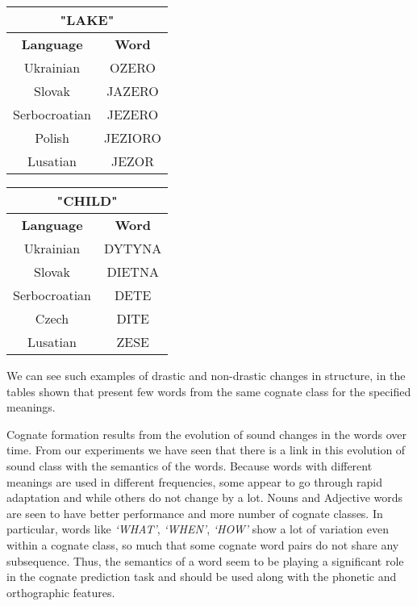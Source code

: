 \begin{table}[h]
\centering
	\begin{minipage}{.5\linewidth}
      \centering

\begin{tabular}{|c|c|}
\hline
\multicolumn{2}{|c|}{\textbf{"LAKE"}} \\ \hline
\textbf{Language}   & \textbf{Word}   \\ \hline
Ukrainian           & OZERO           \\ \hline
Slovak              & JAZERO          \\ \hline
Serbocroatian       & JEZERO          \\ \hline
Polish              & JEZIORO         \\ \hline
Lusatian            & JEZOR           \\ \hline
\end{tabular}


	\end{minipage}%
    \begin{minipage}{.5\linewidth}
    \centering

\begin{tabular}{|c|c|}
\hline
\multicolumn{2}{|c|}{\textbf{"CHILD"}} \\ \hline
\textbf{Language}    & \textbf{Word}   \\ \hline
Ukrainian            & DYTYNA          \\ \hline
Slovak               & DIETNA          \\ \hline
Serbocroatian        & DETE            \\ \hline
Czech                & DITE            \\ \hline
Lusatian             & ZESE            \\ \hline
\end{tabular}

	\end{minipage} 
\end{table}

We can see such examples of drastic and non-drastic changes in structure, in the tables shown that present few words from the same cognate class for the specified meanings.

Cognate formation results from the evolution of sound changes in the words over time. From our experiments we have seen that there is a link in this evolution of sound class with the semantics of the words. Because words with different meanings are used in different frequencies, some appear to go through rapid adaptation and while others do not change by a lot. Nouns and Adjective words are seen to have better performance and more number of cognate classes. In particular, words like \textit{`WHAT'}, \textit{`WHEN'}, \textit{`HOW'} show a lot of variation even within a cognate class, so much that some cognate word pairs do not share any subsequence. Thus, the semantics of a word seem to be playing a significant role in the cognate prediction task and should be used along with the phonetic and orthographic features.

